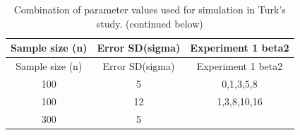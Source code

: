 \documentclass[12pt]{article}
\begin{document}
\begin{longtable}[]{@{}ccc@{}}
\caption{Combination of parameter values used for simulation in Turk's
study. (continued below)}\tabularnewline
\toprule
\begin{minipage}[b]{0.23\columnwidth}\centering\strut
Sample size (n)\strut
\end{minipage} & \begin{minipage}[b]{0.23\columnwidth}\centering\strut
Error SD(sigma)\strut
\end{minipage} & \begin{minipage}[b]{0.25\columnwidth}\centering\strut
Experiment 1 beta2\strut
\end{minipage}\tabularnewline
\midrule
\endfirsthead
\toprule
\begin{minipage}[b]{0.23\columnwidth}\centering\strut
Sample size (n)\strut
\end{minipage} & \begin{minipage}[b]{0.23\columnwidth}\centering\strut
Error SD(sigma)\strut
\end{minipage} & \begin{minipage}[b]{0.25\columnwidth}\centering\strut
Experiment 1 beta2\strut
\end{minipage}\tabularnewline
\midrule
\endhead
\begin{minipage}[t]{0.23\columnwidth}\centering\strut
100\strut
\end{minipage} & \begin{minipage}[t]{0.23\columnwidth}\centering\strut
5\strut
\end{minipage} & \begin{minipage}[t]{0.25\columnwidth}\centering\strut
0,1,3,5,8\strut
\end{minipage}\tabularnewline
\begin{minipage}[t]{0.23\columnwidth}\centering\strut
100\strut
\end{minipage} & \begin{minipage}[t]{0.23\columnwidth}\centering\strut
12\strut
\end{minipage} & \begin{minipage}[t]{0.25\columnwidth}\centering\strut
1,3,8,10,16\strut
\end{minipage}\tabularnewline
\begin{minipage}[t]{0.23\columnwidth}\centering\strut
300\strut
\end{minipage} & \begin{minipage}[t]{0.23\columnwidth}\centering\strut
5\strut
\end{minipage} & \begin{minipage}[t]{0.25\columnwidth}\centering\strut

\end{minipage}
\end{longtable}
\end{document}
